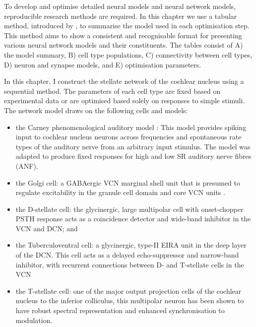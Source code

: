   To develop and optimise detailed neural models and
neural network models, reproducible research methods are required. In
this chapter we use a tabular method, introduced by
\citet{NordlieGewaltigEtAl:2009}, to summarise the model used in each
optimisation step. This method aims to show a consistent and
recognisable format for presenting various neural network models and
their constituents.  The tables consist of A) the model summary, B)
cell type populations, C) connectivity between cell types, D) neuron
and synapse models, and E) optimisation parameters.

\medskip{}

In this chapter, I construct the stellate network of the cochlear
nucleus using a sequential method.  The parameters of each cell type
are fixed based on experimental data or are optimised based solely on
responses to simple stimuli. The network model draws on the following
cells and models:
\begin{itemize}
\item the Carney phenomenological auditory model
  \citet{ZilanyBruceEtAl:2009}: This model provides spiking input to
  cochlear nucleus neurons across frequencies and spontaneous rate
  types of the auditory nerve from an arbitrary input stimulus.  The
  model was adapted to produce fixed responses for high and low SR
  auditory nerve fibres (ANF).
\item the Golgi cell: a GABAergic VCN marginal shell unit that is
  presumed to regulate excitability in the granule cell domain and
  core VCN units \citep{FerragamoGoldingEtAl:1998}.
\item the D-stellate cell: the glycinergic, large multipolar cell with
  onset-chopper PSTH response acts as a co\-incidence detector and
  wide-band inhibitor in the VCN and DCN\@; and
\item the Tuberculo\-ventral cell: a glycinergic, type-II EIRA unit in
  the deep layer of the DCN\@.  This cell acts as a delayed
  echo-suppressor and narrow-band inhibitor, with recurrent
  connections between D- and T-stellate cells in the VCN
\item the T-stellate cell: one of the major output projection cells of
  the cochlear nucleus to the inferior colliculus, this multipolar
  neuron has been shown to have robust spectral representation and
  enhanced synchronisation to modulation.
\end{itemize}

